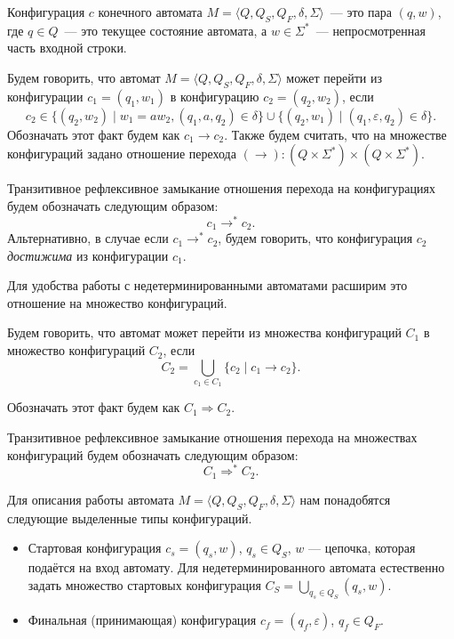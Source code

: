 \begin{definition}[Конфигурация]
    Конфигурация $c$ конечного автомата $M = \langle Q, Q_S, Q_F, \delta, \Sigma \rangle$~--- это пара $(q, w)$, где $q\in Q$~--- это текущее состояние автомата, а $w \in \Sigma^*$~--- непросмотренная часть входной строки.
\end{definition}

\begin{definition}
    Будем говорить, что автомат $M = \langle Q, Q_S, Q_F, \delta, \Sigma \rangle$ может перейти из конфигурации $c_1 = (q_1, w_1)$ в конфигурацию $c_2 = (q_2, w_2)$, если
    \[c_2 \in \{(q_2,w_2) \mid w_1 = aw_2, (q_1,a, q_2) \in \delta\} \cup \{(q_2,w_1) \mid (q_1, \varepsilon, q_2) \in \delta\}.\]
    Обозначать этот факт будем как $c_1 \to c_2$.
    Также будем считать, что на множестве конфигураций задано отношение перехода $(\to):(Q \times \Sigma^*)\times(Q \times \Sigma^*)$.
    
\end{definition}

\begin{definition}
    Транзитивное рефлексивное замыкание отношения перехода на конфигурациях будем обозначать следующим образом: \[ c_1 \to^* c_2. \]
    Альтернативно, в случае если $c_1 \to^* c_2$, будем говорить, что конфигурация $c_2$ \textit{достижима} из конфигурации $c_1$.
\end{definition}

Для удобства работы с недетерминированными автоматами расширим это отношение на множество конфигураций.

\begin{definition}
Будем говорить, что автомат может перейти из множества конфигураций $C_1$ в множество конфигураций $C_2$, если 
\[C_2 = \bigcup_{c_1 \in C_1} \{c_2 \mid c_1 \to c_2 \}.\]

Обозначать этот факт будем как  $C_1 \Rightarrow C_2 $.
\end{definition}

\begin{definition}
Транзитивное рефлексивное замыкание отношения перехода на множествах конфигураций будем обозначать следующим образом: \[ C_1 \Rightarrow^* C_2. \]
\end{definition}

Для описания работы автомата $M = \langle Q, Q_S, Q_F, \delta, \Sigma \rangle$ нам понадобятся следующие выделенные типы конфигураций.
\begin{itemize}
    \item Стартовая конфигурация $c_s = (q_s,w)$, $q_s \in Q_S$, $w$ --- цепочка, которая подаётся на вход автомату. 
    Для недетерминированного автомата естественно задать множество стартовых конфигурация $C_S = \bigcup_{q_s \in Q_S} (q_s,w)$.
    \item Финальная (принимающая) конфигурация $c_f = (q_f,\varepsilon)$, $q_f \in Q_F$.
\end{itemize}

